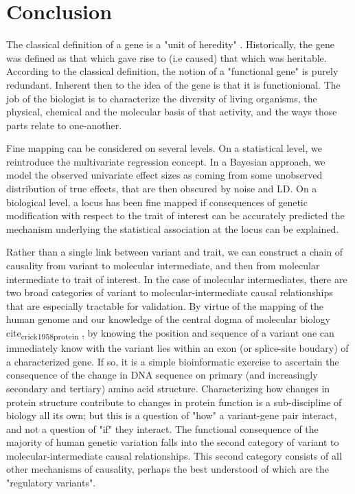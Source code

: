 \chapter{Conclusion}\label{conclusion}

The classical definition of a gene is a "unit of heredity" \cite{gene_book}. Historically,
the gene was defined as that which gave rise to (i.e caused) that which was heritable.  
According to the classical definition, the notion of a "functional gene" is purely redundant.
Inherent then to the idea of the gene is that it is functionional.
The job of the biologist is to characterize the diversity of living organisms, the physical, chemical and the molecular basis of that activity, and the ways those parts relate to one-another.


Fine mapping can be considered on several levels.
On a statistical level, we reintroduce the multivariate regression concept.
In a Bayesian approach, we model the observed univariate effect sizes as coming from some unobserved distribution of true effects,
that are then obscured by noise and LD.
On a biological level, a locus has been fine mapped if consequences of genetic modification with respect to the trait of
interest can be accurately predicted the mechanism underlying the statistical association at the locus can be explained.

Rather than a single link between variant and trait, we can construct a chain of causality from variant to molecular intermediate, and then from molecular intermediate to trait
of interest.  In the case of molecular intermediates, there are two broad categories of variant to molecular-intermediate causal relationships that are especially tractable for 
validation.  By virtue of the mapping of the human genome and our knowledge of the central dogma of molecular biology cite\textsubscript{crick1958protein} , by knowing the position and sequence
of a variant one can immediately know with the variant lies within an exon (or splice-site boudary) of a characterized gene.  If so, it is a simple bioinformatic exercise to 
ascertain the consequence of the change in DNA sequence on primary (and increasingly secondary and tertiary) amino acid structure.  Characterizing how changes in protein
structure contribute to changes in protein function is a sub-discipline of biology all its own; but this is a question of "how" a variant-gene pair interact, and not a question of 
"if" they interact.  The functional consequence of the majority of human genetic variation falls into the second category of variant to molecular-intermediate causal relationships.  
This second category consists of all other mechanisms of causality, perhaps the best understood of which are the "regulatory variants".

